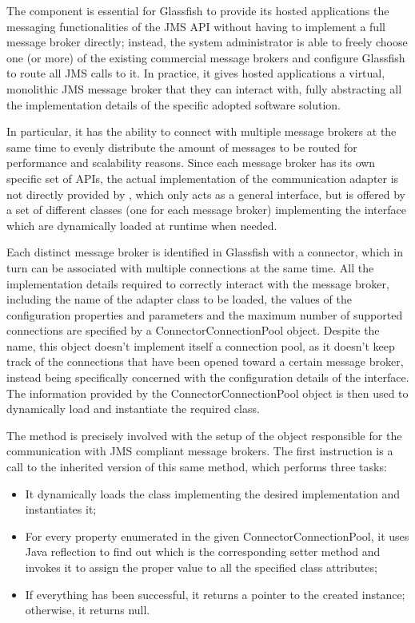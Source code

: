 The  component is essential for Glassfish to provide its hosted applications the messaging functionalities of the JMS API without having to implement a full message broker directly; instead, the system administrator is able to freely choose one (or more) of the existing commercial message brokers and configure Glassfish to route all JMS calls to it. In practice, it gives hosted applications a virtual, monolithic JMS message broker that they can interact with, fully abstracting all the implementation details of the specific adopted software solution.

In particular, it has the ability to connect with multiple message brokers at the same time to evenly distribute the amount of messages to be routed for performance and scalability reasons. Since each message broker has its own specific set of APIs, the actual implementation of the communication adapter is not directly provided by , which only acts as a general interface, but is offered by a set of different classes (one for each message broker) implementing the  interface which are dynamically loaded at runtime when needed.

Each distinct message broker is identified in Glassfish with a connector, which in turn can be associated with multiple connections at the same time. All the implementation details required to correctly interact with the message broker, including the name of the adapter class to be loaded, the values of the configuration properties and parameters and the maximum number of supported connections are specified by a ConnectorConnectionPool object. Despite the name, this object doesn't implement itself a connection pool, as it doesn't keep track of the connections that have been opened toward a certain message broker, instead being specifically concerned with the configuration details of the interface. The information provided by the ConnectorConnectionPool object is then used to dynamically load and instantiate the required  class.

The  method is precisely involved with the setup of the  object responsible for the communication with JMS compliant message brokers. The first instruction is a call to the inherited version of this same method, which performs three tasks:
\begin{itemize}
	\item It dynamically loads the class implementing the desired  implementation and instantiates it;
	\item For every property enumerated in the given ConnectorConnectionPool, it uses Java reflection to find out which is the corresponding setter method and invokes it to assign the proper value to all the specified class attributes;
	\item If everything has been successful, it returns a pointer to the created  instance; otherwise, it returns null.
\end{itemize}

